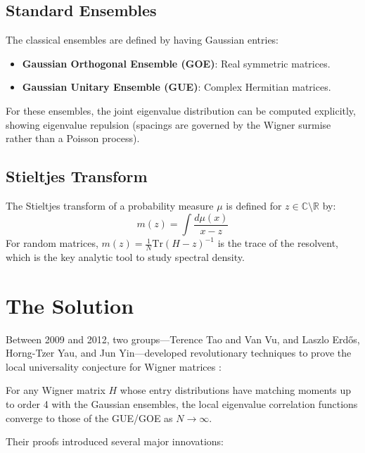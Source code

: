 \subsection{Standard Ensembles}
The classical ensembles are defined by having Gaussian entries:
\begin{itemize}
\item \textbf{Gaussian Orthogonal Ensemble (GOE)}: Real symmetric matrices.
\item \textbf{Gaussian Unitary Ensemble (GUE)}: Complex Hermitian matrices.
\end{itemize}
For these ensembles, the joint eigenvalue distribution can be computed explicitly, showing eigenvalue repulsion (spacings are governed by the Wigner surmise rather than a Poisson process).

\subsection{Stieltjes Transform}
The Stieltjes transform of a probability measure $\mu$ is defined for $z \in \mathbb{C} \setminus \mathbb{R}$ by:
\begin{equation}
m(z) = \int \frac{d\mu(x)}{x - z}
\end{equation}
For random matrices, $m(z) = \frac{1}{N} \text{Tr}(H - z)^{-1}$ is the trace of the resolvent, which is the key analytic tool to study spectral density.

\section{The Solution}

Between 2009 and 2012, two groups—Terence Tao and Van Vu, and Laszlo Erdős, Horng-Tzer Yau, and Jun Yin—developed revolutionary techniques to prove the local universality conjecture for Wigner matrices \cite{erdos2012, taovu2011}:

\begin{theorem}
For any Wigner matrix $H$ whose entry distributions have matching moments up to order 4 with the Gaussian ensembles, the local eigenvalue correlation functions converge to those of the GUE/GOE as $N \to \infty$.
\end{theorem}

Their proofs introduced several major innovations:

